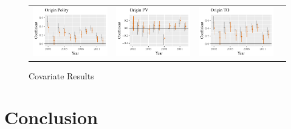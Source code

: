 \documentclass{article}
\begin{document}
\begin{figure}
\begin{tabular}{*{4}{@{}c}@{}}
\includegraphics[scale=.6]{draft_figures/rl_plots/OriginPolity.pdf}   &
\includegraphics[scale=.6]{draft_figures/rl_plots/OriginPV.pdf}    & 
\includegraphics[scale=.6]{draft_figures/rl_plots/OriginTO.pdf}   \\
\end{tabular}
\caption{Covariate Results}
\end{figure}



\section{Conclusion}


\newpage


\end{document}
